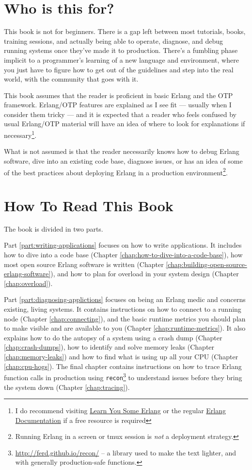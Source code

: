 \documentclass[11pt, oneside]{book}   	%
\newcommand{\otpapp}[1]{\Verb`#1`}
\begin{document}
\section{Who is this for?}
\label{sec:who-is-this-for}

This book is not for beginners. There is a gap left between most tutorials, books, training sessions, and actually being able to operate, diagnose, and debug running systems once they've made it to production. There's a fumbling phase implicit to a programmer's learning of a new language and environment, where you just have to figure how to get out of the guidelines and step into the real world, with the community that goes with it.

This book assumes that the reader is proficient in basic Erlang and the OTP framework. Erlang/OTP features are explained as I see fit — usually when I consider them tricky — and it is expected that a reader who feels confused by usual Erlang/OTP material will have an idea of where to look for explanations if necessary\footnote{I do recommend visiting \href{http://learnyousomeerlang.com}{Learn You Some Erlang} or the regular \href{http://www.erlang.org/erldoc}{Erlang Documentation} if a free resource is required}.

What is not assumed is that the reader necessarily knows how to debug Erlang software, dive into an existing code base, diagnose issues, or has an idea of some of the best practices about deploying Erlang in a production environment\footnote{Running Erlang in a screen or tmux session is \emph{not} a deployment strategy.}.

\section{How To Read This Book}
\label{sec:how-to-read-this-book}

The book is divided in two parts. 

Part \ref{part:writing-applications} focuses on how to write applications. It includes how to dive into a code base (Chapter \ref{chap:how-to-dive-into-a-code-base}), how most open source Erlang software is written (Chapter \ref{chap:building-open-source-erlang-software}), and how to plan for overload in your system design (Chapter \ref{chap:overload}).

Part \ref{part:diagnosing-applictions} focuses on being an Erlang medic and concerns existing, living systems. It contains instructions on how to connect to a running node (Chapter \ref{chap:connecting}), and the basic runtime metrics you should plan to make visible and are available to you (Chapter \ref{chap:runtime-metrics}). It also explains how to do the autopsy of a system using a crash dump (Chapter \ref{chap:crash-dumps}), how to identify and solve memory leaks (Chapter \ref{chap:memory-leaks}) and how to find what is using up all your CPU (Chapter \ref{chap:cpu-hogs}). The final chapter contains instructions on how to trace Erlang function calls in production using \otpapp{recon}\footnote{\href{http://ferd.github.io/recon/}{http://ferd.github.io/recon/} -- a library used to make the text lighter, and with generally production-safe functions.} to understand issues before they bring the system down (Chapter \ref{chap:tracing}).
\end{document}
